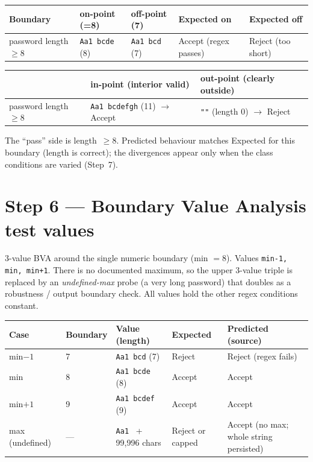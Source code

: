 \documentclass[11pt,a4paper]{article}
\begin{document}
\begin{center}
\begin{tabular}{L{3.4cm} L{2.6cm} L{2.4cm} L{2.9cm} L{2.9cm}}
\toprule
\textbf{Boundary} & \textbf{on-point (=8)} & \textbf{off-point (7)} & \textbf{Expected on} & \textbf{Expected off} \\
\midrule
password length $\ge 8$ & \texttt{Aa1 bcde} (8) & \texttt{Aa1 bcd} (7) & Accept (regex passes) & Reject (too short) \\
\bottomrule
\end{tabular}
\end{center}

\begin{center}
\begin{tabular}{L{3.4cm} L{4.0cm} L{4.0cm}}
\toprule
 & \textbf{in-point (interior valid)} & \textbf{out-point (clearly outside)} \\
\midrule
password length $\ge 8$ & \texttt{Aa1 bcdefgh} (11) $\to$ Accept & \verb|""| (length 0) $\to$ Reject \\
\bottomrule
\end{tabular}
\end{center}

\noindent The ``pass'' side is length~$\ge 8$. Predicted behaviour matches Expected for this
boundary (length is correct); the divergences appear only when the class conditions are
varied (Step~7).

\section{Step 6 --- Boundary Value Analysis test values}
\label{sec:bva}
3-value BVA around the single numeric boundary (min $=8$). Values \texttt{min-1, min,
min+1}. There is no documented maximum, so the upper 3-value triple is replaced by an
\emph{undefined-max} probe (a very long password) that doubles as a robustness / output
boundary check. All values hold the other regex conditions constant.

\begin{center}
\begin{tabular}{L{1.7cm} L{2.0cm} L{3.6cm} L{2.2cm} L{3.4cm}}
\toprule
\textbf{Case} & \textbf{Boundary} & \textbf{Value (length)} & \textbf{Expected} & \textbf{Predicted (source)} \\
\midrule
min$-1$ & 7  & \texttt{Aa1 bcd} (7)   & Reject & Reject (regex fails) \\
min     & 8  & \texttt{Aa1 bcde} (8)  & Accept & Accept \\
min$+1$ & 9  & \texttt{Aa1 bcdef} (9) & Accept & Accept \\
\midrule
max (undefined) & --- & \texttt{Aa1 } + 99{,}996 chars & Reject or capped & Accept (no max; whole string persisted) \\
\bottomrule
\end{tabular}
\end{center}
\end{document}
